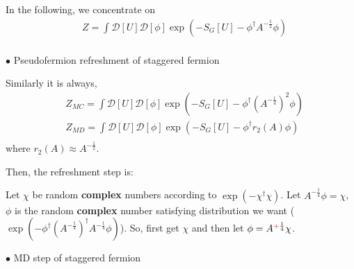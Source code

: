 In the following, we concentrate on
\begin{equation}
\begin{split}
&Z=\int \mathcal{D}[U]  \mathcal {D}[\phi]\exp \left(-S_G[U]-\phi ^{\dagger} A^{-\frac{1}{2}} \phi \right)\\
\end{split}
\end{equation}

$\bullet$ Pseudofermion refreshment of staggered fermion

Similarly it is always,
\begin{equation}
\begin{split}
&Z_{MC}=\int \mathcal{D}[U]  \mathcal {D}[\phi]\exp \left(-S_G[U]-\phi ^{\dagger} \left(A^{-\frac{1}{4}}\right)^2 \phi \right)\\
&Z_{MD}=\int \mathcal{D}[U]  \mathcal {D}[\phi]\exp \left(-S_G[U]-\phi ^{\dagger} r_2(A) \phi \right)\\
\end{split}
\end{equation}
where $r_2(A)\approx A^{-\frac{1}{2}}$.

Then, the refreshment step is:

Let $\chi$ be random \textbf{complex} numbers according to $\exp (-\chi ^{\dagger}\chi)$. Let $A^{-\frac{1}{4}}\phi=\chi$, $\phi$ is the random \textbf{complex} number satisfying distribution we want ($\exp (-\phi^{\dagger} \left(A^{-\frac{1}{4}}\right)^{\dagger} A^{-\frac{1}{4}} \phi)$). So, first get $\chi$ and then let $\phi = A^{\textcolor[rgb]{1,0,0}{+}\frac{1}{4}}\chi$.

$\bullet$ MD step of staggered fermion


